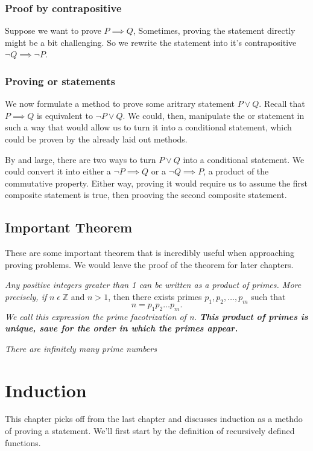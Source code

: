 \documentclass[a4paper]{article}
\begin{document}
\subsubsection{Proof by contrapositive}
Suppose we want to prove $P \implies Q$, Sometimes, proving the statement directly might be a bit challenging. So we rewrite the statement into it's contrapositive $\neg Q \implies \neg P$.
\subsubsection{Proving or statements}
We now formulate a method to prove some aritrary statement $P \vee Q$. Recall that  $P \implies Q$ is equivalent to $\neg P \vee Q$. We could, then, manipulate the or statement in such a way that would allow us to turn it into a conditional statement, which could be proven by the already laid out methods.

By and large, there are two ways to turn $P \vee Q$ into a conditional statement. We could convert it into either a  $\neg P \implies Q$ or a $\neg Q \implies P$, a product of the commutative property. Either way, proving it would require us to assume the first composite statement is true, then prooving the second composite statement.


\subsection{Important Theorem}
These are some important theorem that is incredibly useful when approaching proving problems. We would leave the proof of the theorem for later chapters.
\begin{tcolorbox}[title= Fundamental Theorem of Arithmetic]
	\textit{Any positive integers greater than 1 can be written as a product of primes. More precisely, if } $n \; \epsilon \; \mathbb{Z}$ and $n > 1$, then there exists primes  $p_1,p_2,\ldots,p_m$ such that \[
	n = p_1p_2 \ldots p_m
	.\] 
	\textit{We call this expression the prime facotrization of n. \textbf{This product of primes is unique, save for the order in which the primes appear.}}
\end{tcolorbox}
	
\begin{tcolorbox}[title= Euclid's Theorem]
	\textit{There are infinitely many prime numbers}	
\end{tcolorbox}
\section{Induction}
This chapter picks off from the last chapter and discusses induction as a methdo of proving a statement. We'll first start by the definition of recursively defined functions. 
\end{document}
